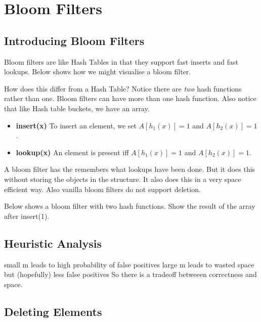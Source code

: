 
\chapter{Bloom Filters}


\section{Introducing Bloom Filters}

Bloom filters are like Hash Tables in that they support 
fast inserts and fast lookups. Below shows how we might 
visualise a bloom filter.


How does this differ from a Hash Table?
Notice there are \textit{two} hash functions rather than one.
Bloom filters can have more than one hash function. 
Also notice that like Hash table buckets, we have an array. 

\begin{itemize}   
\renewcommand{\labelitemi}{$\Box$}
\item \textbf{insert(x)} To insert an element, we set 
$A[h_1(x)] = 1$ and $A[h_2(x)] = 1$.
\item \textbf{lookup(x)}  An element is present iff 
$A[h_1(x)] = 1$ and $A[h_2(x)] = 1$.
\end{itemize}


A bloom filter has the remembers what lookups have been done.
But it does this without storing the objects in the structure.
It also does this in a very space efficient way. 
Also vanilla bloom filters do not support deletion.


\begin{example}
Below shows a bloom filter with two hash functions.
Show the result of the array after insert(1).
\end{example}




\section{Heuristic Analysis}

small m leads to high probability of false positives
large m leads to wasted space but (hopefully) less false positives
So there is a tradeoff betweeen correctness and space.

\section{Deleting Elements}

